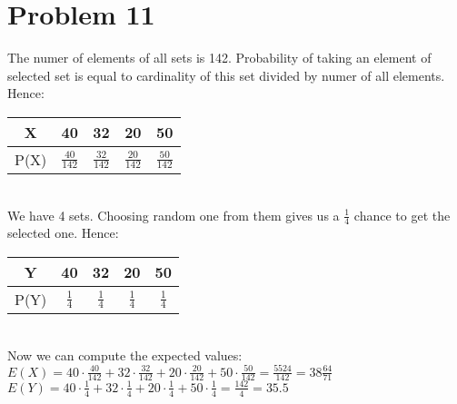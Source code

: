 \documentclass[11pt,wide]{article}
\begin{document}
\section{Problem 11\textdegree}
The numer of elements of all sets is 142. Probability of taking an element of selected set is equal to cardinality of this set divided by numer of all elements. Hence:\\
\begin{tabular}{c *{4}{|c}}
X & 40 & 32 & 20 & 50 \\\hline
P(X) & $\frac{40}{142}$  & $\frac{32}{142}$  & $\frac{20}{142}$ & $\frac{50}{142}$ 
\end{tabular}\\
We have 4 sets. Choosing random one from them gives us a $\frac{1}{4}$ chance to get the selected one. Hence: \\
\begin{tabular}{c *{4}{|c}}
Y & 40 & 32 & 20 & 50 \\\hline
P(Y) & $\frac{1}{4}$  & $\frac{1}{4}$  & $\frac{1}{4}$ & $\frac{1}{4}$
\end{tabular}\\
Now we can compute the expected values: \\
\(E(X) = 40 \cdot \frac{40}{142} + 32 \cdot \frac{32}{142} + 20 \cdot \frac{20}{142} + 50 \cdot \frac{50}{142} = \frac{5524}{142} = 38\frac{64}{71} \) \\
\(E(Y) = 40 \cdot \frac{1}{4} + 32 \cdot \frac{1}{4} + 20 \cdot \frac{1}{4} + 50 \cdot \frac{1}{4} = \frac{142}{4} = 35.5 \)
\end{document}
